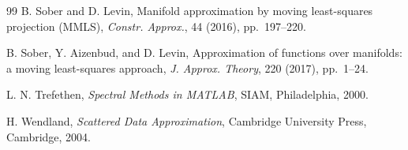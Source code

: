\documentclass[11pt,oneside,reqno]{amsart}
\theoremstyle{plain}
\numberwithin{equation}{section}
\begin{document}
\begin{thebibliography}{99}
B. Sober and D. Levin,
Manifold approximation by moving least-squares projection (MMLS),
\emph{Constr. Approx.}, 44 (2016), pp.~197--220.

B. Sober, Y. Aizenbud, and D. Levin,
Approximation of functions over manifolds: a moving least-squares approach,
\emph{J. Approx. Theory}, 220 (2017), pp.~1--24.

L. N. Trefethen,
\emph{Spectral Methods in MATLAB},
SIAM, Philadelphia, 2000.

H. Wendland,
\emph{Scattered Data Approximation},
Cambridge University Press, Cambridge, 2004.

\end{thebibliography}
\end{document}
